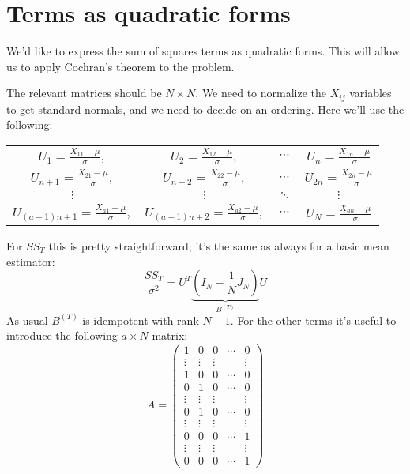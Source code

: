 \documentclass[12pt, a4paper]{article}
\begin{document}
\section{Terms as quadratic forms}
We'd like to express the sum of squares terms as quadratic forms. This will allow us to apply Cochran's theorem to the problem.\par
The relevant matrices should be $N\times N$. We need to normalize the $X_{ij}$ variables to get standard normals, and we need to decide on an ordering. Here we'll use the following:
\begin{center}
\begin{tabular}{*4{c}}
$U_1=\frac{X_{11}-\mu}{\sigma},$ & $U_2=\frac{X_{12}-\mu}{\sigma},$	& $\cdots$ & $U_n=\frac{X_{1n}-\mu}{\sigma}$ \\
$U_{n+1}=\frac{X_{21}-\mu}{\sigma},$ &	$U_{n+2}=\frac{X_{22}-\mu}{\sigma},$		& $\cdots$	& $U_{2n}=\frac{X_{2n}-\mu}{\sigma}$ \\
$\vdots$ & $\vdots$ & $\ddots$ & $\vdots$ \\
$U_{(a-1)n+1}=\frac{X_{a1}-\mu}{\sigma},$ &	$U_{(a-1)n+2}=\frac{X_{a2}-\mu}{\sigma},$		& $\cdots$	& $U_{N}=\frac{X_{an}-\mu}{\sigma}$ \\
\end{tabular}
\end{center}
For $SS_T$ this is pretty straightforward; it's the same as always for a basic mean estimator:
\begin{equation}
\frac{SS_T}{\sigma^2}=U^T\underbrace{\left(I_N-\frac{1}{N}J_N\right)}_{B^{(T)}}U
\end{equation}
As usual $B^{(T)}$ is idempotent with rank $N-1$. For the other terms it's useful to introduce the following $a\times N$ matrix:
\begin{equation}
\label{designmatrix}
A=\begin{pmatrix}
1 & 0 & 0 & \cdots & 0 \\
\vdots & \vdots & \vdots & & \vdots \\
1 & 0 & 0 & \cdots & 0 \\
0 & 1 & 0 & \cdots & 0 \\
\vdots & \vdots & \vdots & & \vdots \\
0 & 1 & 0 & \cdots & 0 \\
\vdots & \vdots & \vdots & & \vdots \\
0 & 0 & 0 & \cdots & 1 \\
\vdots & \vdots & \vdots & & \vdots \\
0 & 0 & 0 & \cdots & 1
\end{pmatrix}
\end{equation}
\end{document}
